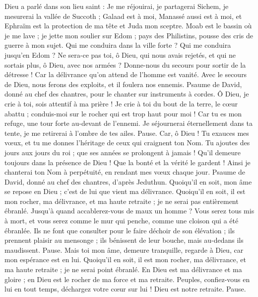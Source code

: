 \begin{multicols}{2}
Dieu a parlé dans son lieu saint : Je me réjouirai, je partagerai Sichem, je mesurerai la vallée de Succoth ;
Galaad est à moi, Manassé aussi est à moi, et Ephraïm est la protection de ma tête et Juda mon sceptre.
Moab est le bassin où je me lave ; je jette mon soulier sur Edom ; pays des Philistins, pousse des cris de guerre à mon sujet.
Qui me conduira dans la ville forte ? Qui me conduira jusqu’en Edom ?
Ne sera-ce pas toi, ô Dieu, qui nous avais rejetés, et qui ne sortais plus, ô Dieu, avec nos armées ?
Donne-nous du secours pour sortir de la détresse ! Car la délivrance qu'on attend de l'homme est vanité.
Avec le secours de Dieu, nous ferons des exploits, et il foulera nos ennemis.
\VerseOne{}Psaume de David, donné au chef des chantres, pour le chanter sur instruments à cordes.
Ô Dieu, je crie à toi, sois attentif à ma prière !
Je crie à toi du bout de la terre, le cœur abattu ; conduis-moi sur le rocher qui est trop haut pour moi !
Car tu es mon refuge, une tour forte au-devant de l'ennemi.
Je séjournerai éternellement dans ta tente, je me retirerai à l'ombre de tes ailes. Pause.
Car, ô Dieu ! Tu exauces mes vœux, et tu me donnes l'héritage de ceux qui craignent ton Nom.
Tu ajoutes des jours aux jours du roi ; que ses années se prolongent à jamais !
Qu’il demeure toujours dans la présence de Dieu ! Que la bonté et la vérité le gardent !
Ainsi je chanterai ton Nom à perpétuité, en rendant mes vœux chaque jour.
\VerseOne{}Psaume de David, donné au chef des chantres, d’après Jeduthun.
Quoiqu'il en soit, mon âme se repose en Dieu ; c'est de lui que vient ma délivrance.
Quoiqu'il en soit, il est mon rocher, ma délivrance, et ma haute retraite ; je ne serai pas entièrement ébranlé.
Jusqu’à quand accablerez-vous de maux un homme ? Vous serez tous mis à mort, et vous serez comme le mur qui penche, comme une cloison qui a été ébranlée.
Ils ne font que consulter pour le faire déchoir de son élévation ; ils prennent plaisir au mensonge ; ils bénissent de leur bouche, mais au-dedans ils maudissent. Pause.
Mais toi mon âme, demeure tranquille, regarde à Dieu, car mon espérance est en lui.
Quoiqu'il en soit, il est mon rocher, ma délivrance, et ma haute retraite ; je ne serai point ébranlé.
En Dieu est ma délivrance et ma gloire ; en Dieu est le rocher de ma force et ma retraite.
Peuples, confiez-vous en lui en tout temps, déchargez votre cœur sur lui ! Dieu est notre retraite. Pause.

\end{multicols}
